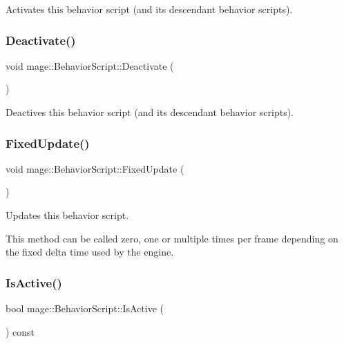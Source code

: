 Activates this behavior script (and its descendant behavior scripts). \hypertarget{classmage_1_1_behavior_script_ab45260db9c30d596b1d688a01458f63e}{}\label{classmage_1_1_behavior_script_ab45260db9c30d596b1d688a01458f63e} 
\subsubsection{\texorpdfstring{Deactivate()}{Deactivate()}}
{\footnotesize\ttfamily void mage\+::\+Behavior\+Script\+::\+Deactivate (\begin{DoxyParamCaption}{ }\end{DoxyParamCaption})\hspace{0.3cm}{\ttfamily [noexcept]}}

Deactives this behavior script (and its descendant behavior scripts). \hypertarget{classmage_1_1_behavior_script_a8318f79ab78798ec37b39bc844f7138c}{}\label{classmage_1_1_behavior_script_a8318f79ab78798ec37b39bc844f7138c} 
\subsubsection{\texorpdfstring{Fixed\+Update()}{FixedUpdate()}}
{\footnotesize\ttfamily void mage\+::\+Behavior\+Script\+::\+Fixed\+Update (\begin{DoxyParamCaption}{ }\end{DoxyParamCaption})\hspace{0.3cm}{\ttfamily [virtual]}}

Updates this behavior script.

This method can be called zero, one or multiple times per frame depending on the fixed delta time used by the engine. \hypertarget{classmage_1_1_behavior_script_a856e1b420ea0ead36adafa750237325c}{}\label{classmage_1_1_behavior_script_a856e1b420ea0ead36adafa750237325c} 
\subsubsection{\texorpdfstring{Is\+Active()}{IsActive()}}
{\footnotesize\ttfamily bool mage\+::\+Behavior\+Script\+::\+Is\+Active (\begin{DoxyParamCaption}{ }\end{DoxyParamCaption}) const\hspace{0.3cm}{\ttfamily [noexcept]}}

